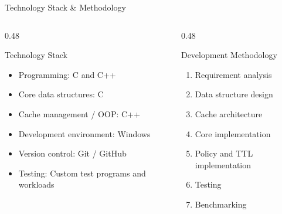 \documentclass[aspectratio=169,10pt]{beamer}
\begin{document}
\begin{frame}{Technology Stack \& Methodology}

\begin{columns}[T]

\begin{column}{0.48\textwidth}

\begin{block}{Technology Stack}

\begin{itemize}

\item Programming: C and C++

\item Core data structures: C

\item Cache management / OOP: C++

\item Development environment: Windows

\item Version control: Git / GitHub

\item Testing: Custom test programs and workloads

\end{itemize}

\end{block}

\end{column}

\begin{column}{0.48\textwidth}

\begin{block}{Development Methodology}

\begin{enumerate}

\item Requirement analysis

\item Data structure design

\item Cache architecture

\item Core implementation

\item Policy and TTL implementation

\item Testing

\item Benchmarking


\end{enumerate}
\end{block}
\end{column}
\end{columns}
\end{frame}
\end{document}
